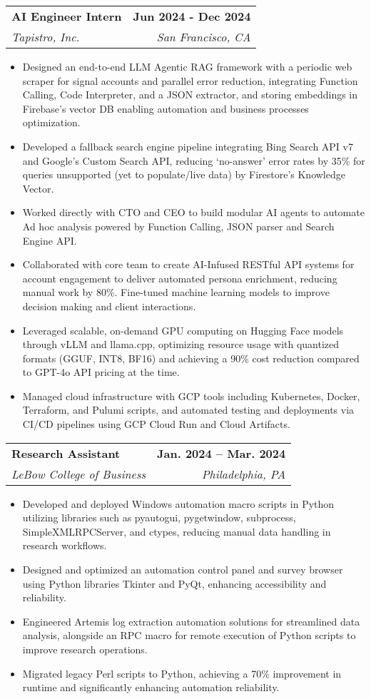 \documentclass[letterpaper,10pt]{article}
\makeatletter
\newcommand{\resumeItem}[1]{
  \item\small{
    {#1 \vspace{-5pt}}
  }
}
\newcommand{\resumeSubheading}[4]{
  \vspace{0pt}\item
    \begin{tabular*}{0.97\textwidth}[t]{l@{\extracolsep{\fill}}r}
      \textbf{#1} & \textbf{#2} \\
      \textit{\small#3} & \textit{\small #4} \\
    \end{tabular*}\vspace{-10pt}
}
\newcommand{\resumeItemListStart}{\begin{itemize}}
\newcommand{\resumeItemListEnd}{\end{itemize}\vspace{-5pt}}
\makeatother
\begin{document}
  \resumeSubheading
    {AI Engineer Intern}{Jun 2024 - Dec 2024}
    {Tapistro, Inc.}{San Francisco, CA}
    \resumeItemListStart
      \resumeItem{Designed an end-to-end LLM Agentic RAG framework with a periodic web scraper for signal accounts and parallel error reduction, integrating Function Calling, Code Interpreter, and a JSON extractor, and storing embeddings in Firebase’s vector DB enabling automation and business processes optimization.}
      \resumeItem{Developed a fallback search engine pipeline integrating Bing Search API v7 and Google’s Custom Search API, reducing ‘no-answer’ error rates by 35\% for queries unsupported (yet to populate/live data) by Firestore’s Knowledge Vector.}
      \resumeItem{Worked directly with CTO and CEO to build modular AI agents to automate Ad hoc analysis powered by Function Calling, JSON parser and Search Engine API.}
      \resumeItem{Collaborated with core team to create AI-Infused RESTful API systems for account engagement to deliver automated persona enrichment, reducing manual work by 80\%. Fine-tuned machine learning models to improve decision making and client interactions.}\resumeItem{Leveraged scalable, on-demand GPU computing on Hugging Face models through vLLM and llama.cpp, optimizing resource usage with quantized formats (GGUF, INT8, BF16) and achieving a 90\% cost reduction compared to GPT-4o API pricing at the time.}
      \resumeItem{Managed cloud infrastructure with GCP tools including Kubernetes, Docker, Terraform, and Pulumi scripts, and automated testing and deployments via CI/CD pipelines using GCP Cloud Run and Cloud Artifacts.}
    \resumeItemListEnd

  
  \resumeSubheading
    {Research Assistant}{Jan. 2024 -- Mar. 2024}
    {LeBow College of Business}{Philadelphia, PA}
    \resumeItemListStart
      \resumeItem{Developed and deployed Windows automation macro scripts in Python utilizing libraries such as pyautogui, pygetwindow, subprocess, SimpleXMLRPCServer, and ctypes, reducing manual data handling in research workflows.}
      \resumeItem{Designed and optimized an automation control panel and survey browser using Python libraries Tkinter and PyQt, enhancing accessibility and reliability.}
      \resumeItem{Engineered Artemis log extraction automation solutions for streamlined data analysis, alongside an RPC macro for remote execution of Python scripts to improve research operations.}
      \resumeItem{Migrated legacy Perl scripts to Python, achieving a 70\% improvement in runtime and significantly enhancing automation reliability.}
    \resumeItemListEnd
      
\end{document}
